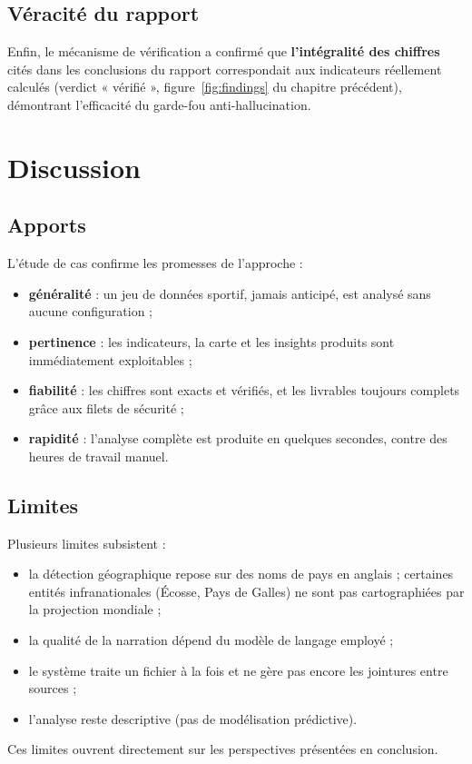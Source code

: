\subsection{Véracité du rapport}
Enfin, le mécanisme de vérification a confirmé que \textbf{l'intégralité des
chiffres} cités dans les conclusions du rapport correspondait aux indicateurs
réellement calculés (verdict « vérifié », figure~\ref{fig:findings} du
chapitre précédent), démontrant l'efficacité du garde-fou anti-hallucination.

\section{Discussion}

\subsection{Apports}
L'étude de cas confirme les promesses de l'approche :
\begin{itemize}
  \item \textbf{généralité} : un jeu de données sportif, jamais anticipé, est
        analysé sans aucune configuration ;
  \item \textbf{pertinence} : les indicateurs, la carte et les insights
        produits sont immédiatement exploitables ;
  \item \textbf{fiabilité} : les chiffres sont exacts et vérifiés, et les
        livrables toujours complets grâce aux filets de sécurité ;
  \item \textbf{rapidité} : l'analyse complète est produite en quelques
        secondes, contre des heures de travail manuel.
\end{itemize}

\subsection{Limites}
Plusieurs limites subsistent :
\begin{itemize}
  \item la détection géographique repose sur des noms de pays en anglais ;
        certaines entités infranationales (Écosse, Pays de Galles) ne sont pas
        cartographiées par la projection mondiale ;
  \item la qualité de la narration dépend du modèle de langage employé ;
  \item le système traite un fichier à la fois et ne gère pas encore les
        jointures entre sources ;
  \item l'analyse reste descriptive (pas de modélisation prédictive).
\end{itemize}
Ces limites ouvrent directement sur les perspectives présentées en conclusion.


